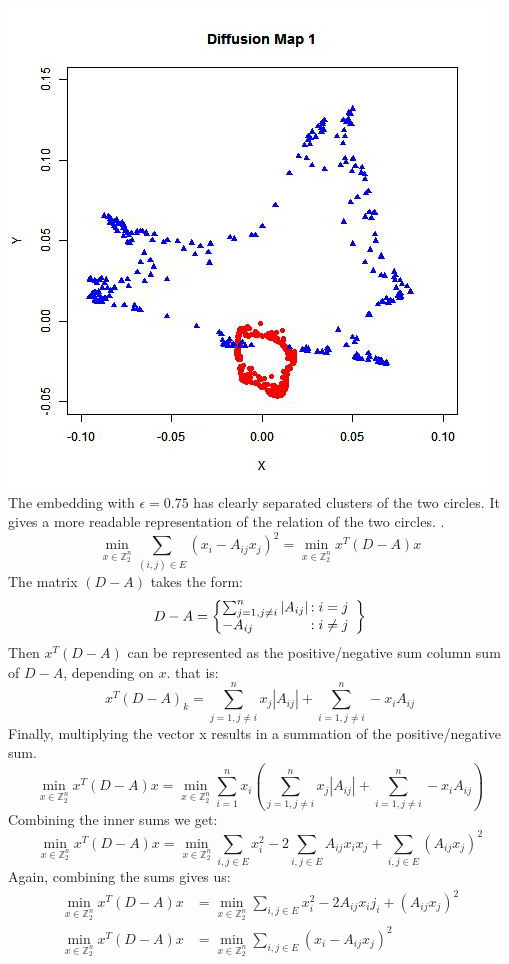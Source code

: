 \documentclass[12pt]{article}
\begin{document}
\includegraphics[scale = .55]{DiffusionMap1.jpeg} \\
The embedding with $\epsilon = 0.75$ has clearly separated clusters of the two circles. It gives a more readable representation of the relation of the two circles.
. \[\min_{x\in\mathbb{Z}_2^n}\sum_{(i,j)\in E}(x_i  - A_{ij}x_j)^2 = \min_{x\in\mathbb{Z}_2^n}x^T(D-A)x\] 
The matrix $(D-A)$ takes the form: \[
D - A = \left\{
\begin{array}{@{}l@{\thinspace}l}
\sum_{j=1,j \neq i}^n|A_{ij}| &: i = j \\
-A_{ij} &: i \neq j \\
\end{array}
\right\}
\]
Then $x^T(D-A)$ can be represented as the positive/negative sum column sum of $D-A$, depending on $x$. that is:
\[
x^T(D-A)_k = \sum_{j=1,j \neq i}^nx_j|A_{ij}|+\sum_{i=1,j\neq i}^n-x_iA_{ij}
\]
Finally, multiplying the vector x results in a summation of the positive/negative sum.
\[
\min_{x\in\mathbb{Z}_2^n}x^T(D-A)x =\min_{x\in\mathbb{Z}_2^n}\sum_{i=1}^nx_i(\sum_{j=1,j \neq i}^nx_j|A_{ij}|+\sum_{i=1,j\neq i}^n-x_iA_{ij})
\]
Combining the inner sums we get:
\[
\min_{x\in\mathbb{Z}_2^n}x^T(D-A)x = \min_{x\in\mathbb{Z}_2^n}\sum_{i,j\in E}x_i^2 -2\sum_{i,j\in E}A_{ij}x_ix_j + \sum_{i,j\in E}(A_{ij}x_j)^2
\]
Again, combining the sums gives us:
\begin{align} \nonumber
\min_{x\in\mathbb{Z}_2^n}x^T(D-A)x &= \min_{x\in\mathbb{Z}_2^n}\sum_{i,j\in E}x_i^2 -2A_{ij}x_ij_i + (A_{ij}x_j)^2 \\ \nonumber
\min_{x\in\mathbb{Z}_2^n}x^T(D-A)x &= \min_{x\in\mathbb{Z}_2^n}\sum_{i,j\in E}(x_i - A_{ij}x_j)^2
\end{align}
\end{document}
